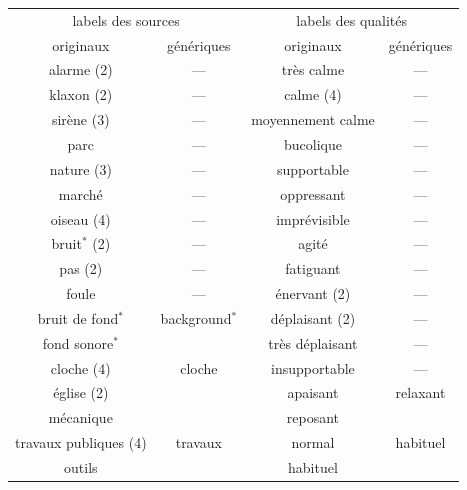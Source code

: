 \begin{table}[t]
\centering
\tiny 
\begin{tabular}{cc|cc}
\multicolumn{2}{c|}{labels des sources}         & \multicolumn{2}{c}{labels des qualités}      \\
originaux             & génériques              & originaux & génériques       \\
\hline
alarme (2)            & ---                     &  très calme            & --- \\
klaxon  (2)           & ---                     &  calme (4)             & ---   \\ 
sirène (3)            & ---                     &  moyennement calme     & ---  \\ 
parc                  & ---                     &  bucolique             & ---   \\
nature (3)            & ---                     &  supportable           & ---  \\
marché                & ---                     &  oppressant            & ---\\
oiseau (4)            & ---                     &  imprévisible         & ---  \\ 
bruit$^*$ (2)         & ---                     &  agité                 & --- \\ 
pas (2)               & ---                     &  fatiguant             & --- \\
foule                 & ---                     &  énervant (2)          & --- \\
\cline{1-2}         
bruit de fond$^*$     & background$^*$          &  déplaisant (2)        & ---   \\ 
fond sonore$^*$       &                         &  très déplaisant       & ---    \\ 
\cline{1-2}
cloche (4)            & cloche                  &  insupportable         & --- \\  \cline{3-4}
église (2)            &                         &  apaisant              & relaxant    \\ 
\cline{1-2}
mécanique             &                         &  reposant              &  \\ \cline{3-4}
travaux publiques (4) & travaux                 &  normal                & habituel     \\ 
outils                &                         &  habituel              & \\  	
\cline{1-2}			                                                             

\end{tabular}
\end{table}
